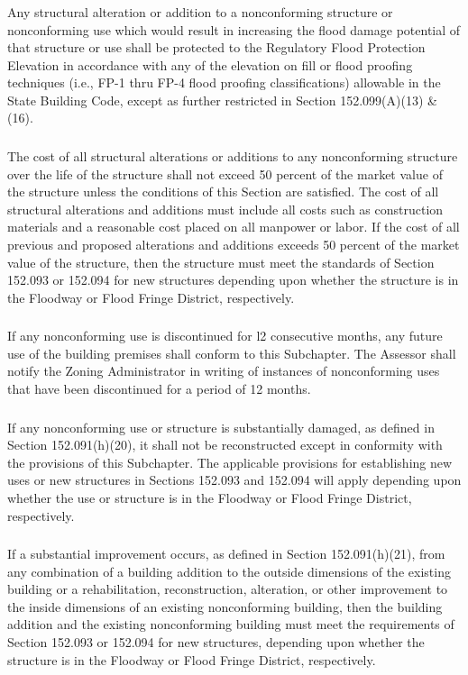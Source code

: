 \subsubsection{}
Any structural alteration or addition to a nonconforming structure or nonconforming use which would result in increasing the flood damage potential of that structure or use shall be protected to the Regulatory Flood Protection Elevation in accordance with any of the elevation on fill or flood proofing techniques (i.e., FP-1 thru FP-4 flood proofing classifications) allowable in the State Building Code, except as further restricted in Section 152.099(A)(13) \& (16).
\subsubsection{}
The cost of all structural alterations or additions to any nonconforming structure over the life of the structure shall not exceed 50 percent of the market value of the structure unless the conditions of this Section are satisfied. The cost of all structural alterations and additions must include all costs such as construction materials and a reasonable cost placed on all manpower or labor. If the cost of all previous and proposed alterations and additions exceeds 50 percent of the market value of the structure, then the structure must meet the standards of Section 152.093 or 152.094 for new structures depending upon whether the structure is in the Floodway or Flood Fringe District, respectively.
\subsubsection{}
If any nonconforming use is discontinued for l2 consecutive months, any future use of the building premises shall conform to this Subchapter. The Assessor shall notify the Zoning Administrator in writing of instances of nonconforming uses that have been discontinued for a period of 12 months.
\subsubsection{}
If any nonconforming use or structure is substantially damaged, as defined in Section 152.091(h)(20), it shall not be reconstructed except in conformity with the provisions of this Subchapter. The applicable provisions for establishing new uses or new structures in Sections 152.093 and 152.094 will apply depending upon whether the use or structure is in the Floodway or Flood Fringe District, respectively.
\subsubsection{}
If a substantial improvement occurs, as defined in Section 152.091(h)(21), from any combination of a building addition to the outside dimensions of the existing building or a rehabilitation, reconstruction, alteration, or other improvement to the inside dimensions of an existing nonconforming building, then the building addition and the existing nonconforming building must meet the requirements of Section 152.093 or 152.094 for new structures, depending upon whether the structure is in the Floodway or Flood Fringe District, respectively.


